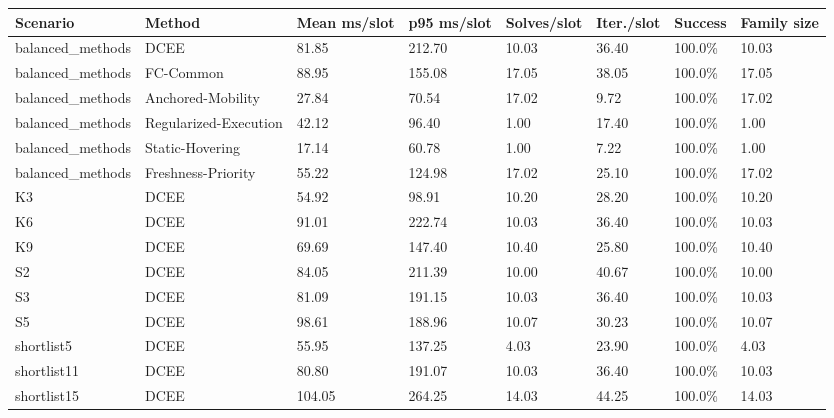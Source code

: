 \begin{tabular}{llllllll}
\toprule
Scenario & Method & Mean ms/slot & p95 ms/slot & Solves/slot & Iter./slot & Success & Family size \\
\midrule
balanced_methods & DCEE & 81.85 & 212.70 & 10.03 & 36.40 & 100.0\% & 10.03 \\
balanced_methods & FC-Common & 88.95 & 155.08 & 17.05 & 38.05 & 100.0\% & 17.05 \\
balanced_methods & Anchored-Mobility & 27.84 & 70.54 & 17.02 & 9.72 & 100.0\% & 17.02 \\
balanced_methods & Regularized-Execution & 42.12 & 96.40 & 1.00 & 17.40 & 100.0\% & 1.00 \\
balanced_methods & Static-Hovering & 17.14 & 60.78 & 1.00 & 7.22 & 100.0\% & 1.00 \\
balanced_methods & Freshness-Priority & 55.22 & 124.98 & 17.02 & 25.10 & 100.0\% & 17.02 \\
K3 & DCEE & 54.92 & 98.91 & 10.20 & 28.20 & 100.0\% & 10.20 \\
K6 & DCEE & 91.01 & 222.74 & 10.03 & 36.40 & 100.0\% & 10.03 \\
K9 & DCEE & 69.69 & 147.40 & 10.40 & 25.80 & 100.0\% & 10.40 \\
S2 & DCEE & 84.05 & 211.39 & 10.00 & 40.67 & 100.0\% & 10.00 \\
S3 & DCEE & 81.09 & 191.15 & 10.03 & 36.40 & 100.0\% & 10.03 \\
S5 & DCEE & 98.61 & 188.96 & 10.07 & 30.23 & 100.0\% & 10.07 \\
shortlist5 & DCEE & 55.95 & 137.25 & 4.03 & 23.90 & 100.0\% & 4.03 \\
shortlist11 & DCEE & 80.80 & 191.07 & 10.03 & 36.40 & 100.0\% & 10.03 \\
shortlist15 & DCEE & 104.05 & 264.25 & 14.03 & 44.25 & 100.0\% & 14.03 \\
\bottomrule
\end{tabular}
